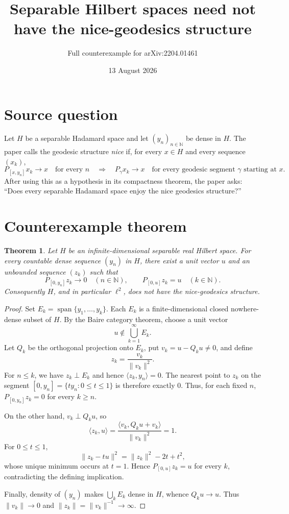 \documentclass[11pt]{article}
\title{Separable Hilbert spaces need not have the nice-geodesics structure}
\author{Full counterexample for arXiv:2204.01461}
\date{13 August 2026}
\newtheorem{theorem}{Theorem}
\newcommand{\N}{\mathbb N}
\begin{document}
\maketitle

\begin{center}
\end{center}

\section*{Source question}

Let $H$ be a separable Hadamard space and let $(y_n)_{n\in\N}$ be dense in
$H$.  The paper calls the geodesic structure \emph{nice} if, for every
$x\in H$ and every sequence $(x_k)$,
\[
 P_{[x,y_n]}x_k\longrightarrow x\quad\text{for every }n
 \quad\Longrightarrow\quad
 P_\gamma x_k\longrightarrow x\quad\text{for every geodesic segment }
 \gamma\text{ starting at }x.
\]
After using this as a hypothesis in its compactness theorem, the paper asks:
``Does every separable Hadamard space enjoy the nice geodesics structure?''

\section*{Counterexample theorem}

\begin{theorem}\label{thm:counterexample}
Let $H$ be an infinite-dimensional separable real Hilbert space.  For every
countable dense sequence $(y_n)$ in $H$, there exist a unit vector $u$ and an
unbounded sequence $(z_k)$ such that
\[
 P_{[0,y_n]}z_k\longrightarrow0\quad(n\in\N),
 \qquad
 P_{[0,u]}z_k=u\quad(k\in\N).
\]
Consequently $H$, and in particular $\ell^2$, does not have the
nice-geodesics structure.
\end{theorem}

\begin{proof}
Set $E_k=\operatorname{span}\{y_1,\ldots,y_k\}$.  Each $E_k$ is a
finite-dimensional closed nowhere-dense subset of $H$.  By the Baire category
theorem, choose a unit vector
\[
 u\notin\bigcup_{k=1}^\infty E_k.
\]
Let $Q_k$ be the orthogonal projection onto $E_k$, put
$v_k=u-Q_ku\ne0$, and define
\[
 z_k=\frac{v_k}{\|v_k\|^2}.
\]
For $n\le k$, we have $z_k\perp E_k$ and hence
$\langle z_k,y_n\rangle=0$.  The nearest point to $z_k$ on the segment
$[0,y_n]=\{ty_n:0\le t\le1\}$ is therefore exactly $0$.  Thus, for each
fixed $n$, $P_{[0,y_n]}z_k=0$ for every $k\ge n$.

On the other hand, $v_k\perp Q_ku$, so
\[
 \langle z_k,u\rangle
 =\frac{\langle v_k,Q_ku+v_k\rangle}{\|v_k\|^2}=1.
\]
For $0\le t\le1$,
\[
 \|z_k-tu\|^2=\|z_k\|^2-2t+t^2,
\]
whose unique minimum occurs at $t=1$.  Hence
$P_{[0,u]}z_k=u$ for every $k$, contradicting the defining implication.

Finally, density of $(y_n)$ makes $\bigcup_kE_k$ dense in $H$, whence
$Q_ku\to u$.  Thus $\|v_k\|\to0$ and
$\|z_k\|=\|v_k\|^{-1}\to\infty$.
\end{proof}
\end{document}
